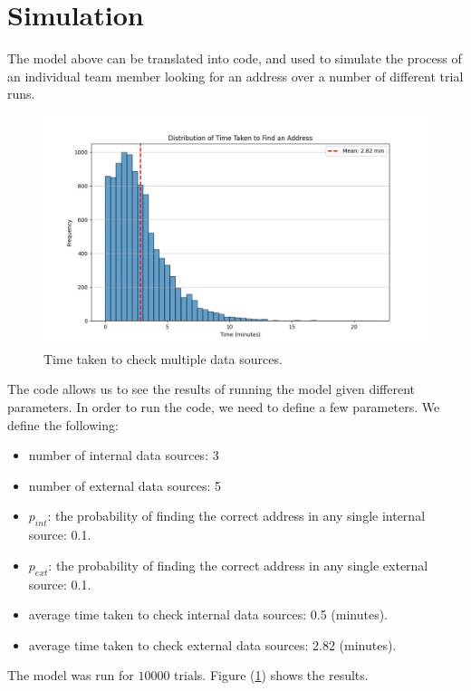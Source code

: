\documentclass{article}
\begin{document}
\section{Simulation}

The model above can be translated into code, and used to simulate the process of an individual team member looking for an address over a number of different trial runs.


\begin{figure}
    \centering
    \includegraphics[width=1\linewidth]{distribution1.jpg}
    \caption{Time taken to check multiple data sources.}
    \label{fig:modelrun1}
\end{figure}
The code allows us to see the results of running the model given different parameters. In order to run the code, we need to define a few parameters. We define the following:

\begin{itemize}
    \item number of internal data sources: 3
    \item number of external data sources: 5
    \item $p_{int}$: the probability of finding the correct address in any single internal source: 0.1.
    \item $p_{ext}$: the probability of finding the correct address in any single external source: 0.1.
    \item average time taken to check internal data sources: 0.5 (minutes).
    \item average time taken to check external data sources: 2.82 (minutes).
\end{itemize}

The model was run for $10000$ trials. Figure (\ref{fig:modelrun1}) shows the results.  
\end{document}
